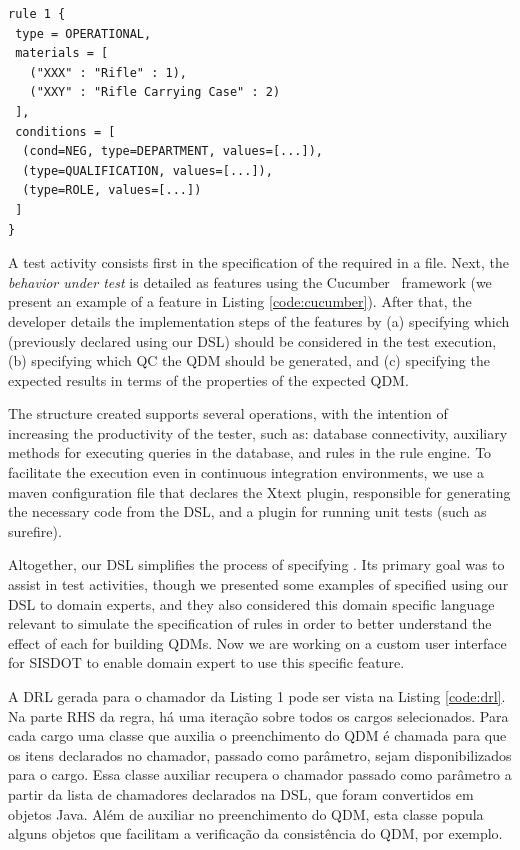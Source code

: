 \begin{small}
\begin{lstlisting}[frame=single, language=DSL, caption={\it Example of a \shc declaration using our DSL}, label={code:dslExample}]
rule 1 { 
 type = OPERATIONAL, 
 materials = [ 
   ("XXX" : "Rifle" : 1), 
   ("XXY" : "Rifle Carrying Case" : 2)
 ], 
 conditions = [ 
  (cond=NEG, type=DEPARTMENT, values=[...]),
  (type=QUALIFICATION, values=[...]), 
  (type=ROLE, values=[...])
 ]
}
\end{lstlisting}
\end{small}


A test activity consists first in the specification of the required \callers in a file. Next, the \emph{behavior under 
test} is detailed as features using the Cucumber~\cite{wynne2017cucumber} framework (we present an 
example of a feature in Listing \ref{code:cucumber}). After that, the developer details 
the implementation steps of the features by (a) specifying which \callers (previously declared using our DSL) should be considered 
in the test execution, (b) specifying which QC the QDM should be generated, and (c) specifying the expected results in terms 
of the properties of the expected QDM. 

The structure created supports several operations, with the intention 
of increasing the productivity of the tester, such as: database connectivity, auxiliary methods for executing queries 
in the database, and rules in the rule engine. To facilitate the execution even in continuous integration 
environments, we use a maven configuration file that declares the Xtext plugin, responsible for 
generating the necessary code from the DSL, and a plugin for running unit tests (such as surefire).


Altogether, our DSL simplifies the process of specifying \callers. Its primary goal was to 
assist in test activities, though we presented some examples of \callers specified using 
our DSL to domain experts, and they also considered this domain specific language relevant 
to simulate the specification of rules in order to better understand the effect of each 
\shc for building QDMs. Now we are working on a custom user interface for SISDOT to enable domain 
expert to use this specific feature. 


 {\color{red}A DRL gerada para o chamador da Listing 1 pode ser vista na} Listing \ref{code:drl}.  {\color{red} Na parte RHS da regra, há uma iteração sobre todos os cargos selecionados. Para cada cargo uma classe que auxilia o preenchimento do QDM é chamada para que os itens declarados no chamador, passado como parâmetro, sejam disponibilizados para o cargo. Essa classe auxiliar recupera o chamador passado como parâmetro a partir da lista de chamadores declarados na DSL, que foram convertidos em objetos Java. Além de auxiliar no preenchimento do QDM, esta classe popula alguns objetos que facilitam a verificação da consistência do QDM, por exemplo.}

